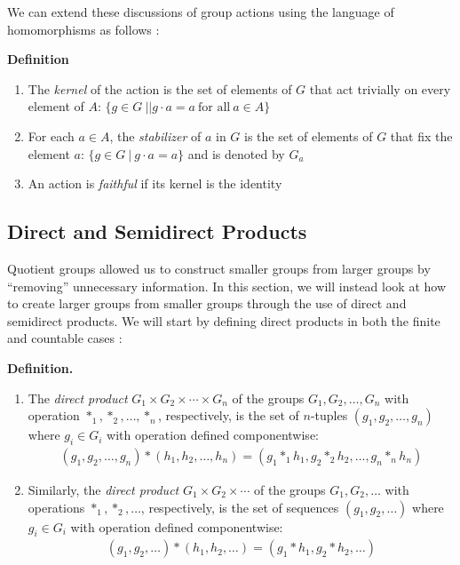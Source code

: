 \documentclass[11pt, reqno]{amsart}
\theoremstyle{plain}
\theoremstyle{definition}
\theoremstyle{example}
\begin{document}
We can extend these discussions of group actions using the language of homomorphisms as follows \cite[\S 4.1, p. 112]{dummit}:

\par
\textbf{Definition}
\begin{enumerate}
\item The \textit{kernel} of the action is the set of elements of $G$ that act trivially on every element of $A$: $\{g \in G \ | | g \cdot a = a \ \text{for all} \ a \in A\}$
\item For each $a \in A$, the \textit{stabilizer} of $a$ in $G$ is the set of elements of $G$ that fix the element $a$: $\{g \in G \ | \ g \cdot a = a\}$ and is denoted by $G_a$
\item An action is \textit{faithful} if its kernel is the identity
\end{enumerate}

\subsection{Direct and Semidirect Products}

Quotient groups allowed us to construct smaller groups from larger groups by ``removing'' unnecessary information. In this section, we will instead look at how to create larger groups from smaller groups through the use of direct and semidirect products. We will start by defining direct products in both the finite and countable cases \cite[\S 5.1, p. 152]{dummit}:

\par
\textbf{Definition.}
\begin{enumerate}
\item The \textit{direct product} $G_1 \times G_2 \times \cdots \times G_n$ of the groups $G_1, G_2, \ldots, G_n$ with operation $*_1, *_2, \ldots, *_n$, respectively, is the set of $n$-tuples $(g_1, g_2, \ldots, g_n)$ where $g_i \in G_i$ with operation defined componentwise:
\begin{align*}
(g_1, g_2, \ldots, g_n) * (h_1, h_2, \ldots, h_n) = (g_1 *_1 h_1, g_2 *_2 h_2, \ldots, g_n *_n h_n)
\end{align*}

\item Similarly, the \textit{direct product} $G_1 \times G_2 \times \cdots$ of the groups $G_1, G_2, \ldots$ with operations $*_1, *_2, \ldots$, respectively, is the set of sequences $(g_1, g_2, \ldots)$ where $g_i \in G_i$ with operation defined componentwise:
\begin{align*}
(g_1, g_2, \ldots) * (h_1, h_2, \ldots) = (g_1 * h_1, g_2 * h_2, \ldots)
\end{align*}
\end{enumerate}
\end{document}
